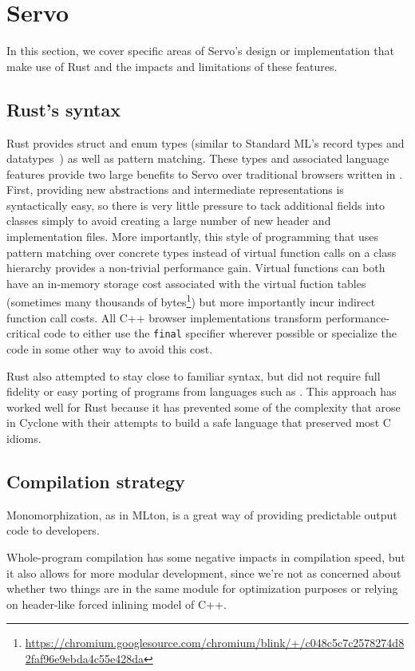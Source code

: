 \section{Servo}
\label{sec:servo}
In this section, we cover specific areas of Servo's design or implementation that make use of Rust
and the impacts and limitations of these features.

\subsection{Rust's syntax}
Rust provides struct and enum types (similar to Standard ML's record types and datatypes~\cite{sml97-definition}) as
well as pattern matching.
These types and associated language features provide two large benefits to Servo over traditional browsers
written in \Cplusplus{}.
First, providing new abstractions and intermediate representations is syntactically easy, so there is very little
pressure to tack additional fields into classes simply to avoid creating a large number of new header and implementation
files.
More importantly, this style of programming that uses pattern matching over concrete types instead of
virtual function calls on a class hierarchy provides a non-trivial performance gain.
Virtual functions can both have an in-memory storage cost associated with the virtual fuction tables (sometimes many thousands of bytes\footnote{\url{https://chromium.googlesource.com/chromium/blink/+/c048c5c7c2578274d82faf96e9ebda4c55e428da}}) but more importantly
incur indirect function call costs.
All C++ browser implementations transform performance-critical code to either use the \lstinline[language=C]{final}
specifier wherever possible or specialize the code in some other way to avoid this cost.

Rust also attempted to stay close to familiar syntax, but did not require full fidelity or easy porting of
programs from languages such as \Cplusplus{}.
This approach has worked well for Rust because it has prevented some of the complexity that arose in Cyclone
with their attempts to build a safe language that preserved most C idioms.

\subsection{Compilation strategy}
Monomorphization, as in MLton, is a great way of providing predictable output code to developers.

Whole-program compilation has some negative impacts in compilation speed, but it also allows for more modular development, since we're not as concerned about whether two things are in the same module for optimization purposes or relying on header-like forced inlining model of C++.


